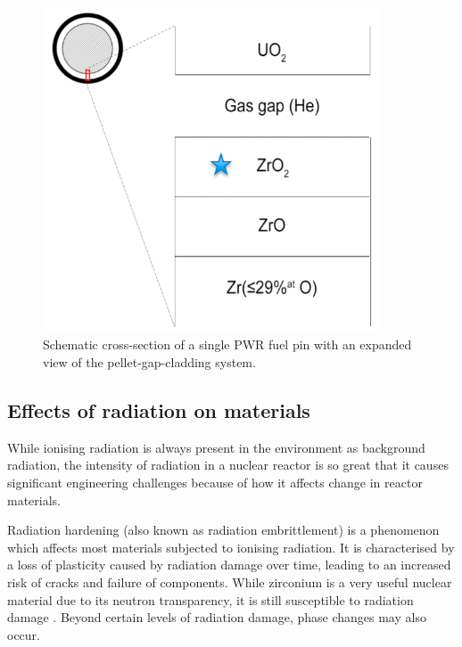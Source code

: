 \begin{figure}[ht]
\centering
\includegraphics[width=10cm]{images/gas_gap.png}
\caption{Schematic cross-section of a single PWR fuel pin with an expanded view of the pellet-gap-cladding system.}
\label{figure:gas_gap}
\end{figure}

\subsection{Effects of radiation on materials} 

While ionising radiation is always present in the environment as background radiation, the intensity of radiation in a nuclear reactor is so great that it causes significant engineering challenges because of how it affects change in reactor materials.

Radiation hardening (also known as radiation embrittlement) is a phenomenon which affects most materials subjected to ionising radiation. It is characterised by a loss of plasticity caused by radiation damage over time, leading to an increased risk of cracks and failure of components. While zirconium is a very useful nuclear material due to its neutron transparency, it is still susceptible to radiation damage \cite{Wisner1998}. Beyond certain levels of radiation damage, phase changes may also occur. %

